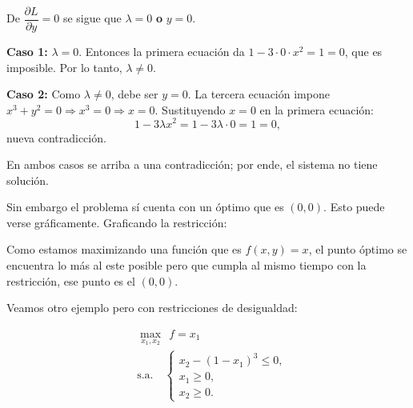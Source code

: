 \documentclass{article}
\begin{document}
De \(\dfrac{\partial L}{\partial y}=0\) se sigue que \(\lambda=0\) \textbf{o} \(y=0\).

\textbf{Caso 1:} \(\lambda=0\). Entonces la primera ecuación da \(1-3\cdot 0\cdot x^2=1=0\), que es imposible. 
Por lo tanto, \(\lambda\neq 0\).

\textbf{Caso 2:} Como \(\lambda\neq 0\), debe ser \(y=0\). La tercera ecuación impone
\(x^3+y^2=0 \Rightarrow x^3=0 \Rightarrow x=0\).
Sustituyendo \(x=0\) en la primera ecuación:
\[
1-3\lambda x^2 = 1-3\lambda\cdot 0 = 1=0,
\]
nueva contradicción.

En ambos casos se arriba a una contradicción; por ende, el sistema no tiene solución.

Sin embargo el problema sí cuenta con un óptimo que es $(0,0)$. Esto puede verse gráficamente. Graficando la restricción:

\begin{center}
\end{center}
Como estamos maximizando una función que es $f(x,y)=x$, el punto óptimo se encuentra lo más al este posible pero que cumpla al mismo tiempo con la restricción, ese punto es el $(0,0)$.

Veamos otro ejemplo pero con restricciones de desigualdad:


\[
\begin{aligned}
&\max_{x_1,x_2}\ \ f=x_1\\
&\text{s.a.}\quad 
\begin{cases}
x_2-(1-x_1)^3 \le 0,\\
x_1 \ge 0,\\
x_2 \ge 0.
\end{cases}
\end{aligned}
\]
\end{document}
